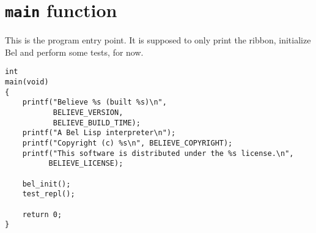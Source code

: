 \documentclass[openright,a4paper,twoside,12pt]{memoir}
\begin{document}
\section{\texttt{main} function}
\label{sec:orga5c2dbe}

This is the program entry point. It is supposed to only print the
ribbon, initialize Bel and perform some tests, for now.

\begin{verbatim}
int
main(void)
{
    printf("Believe %s (built %s)\n",
           BELIEVE_VERSION,
           BELIEVE_BUILD_TIME);
    printf("A Bel Lisp interpreter\n");
    printf("Copyright (c) %s\n", BELIEVE_COPYRIGHT);
    printf("This software is distributed under the %s license.\n",
          BELIEVE_LICENSE);

    bel_init();
    test_repl();
    
    return 0;
}
\end{verbatim}
\end{document}
